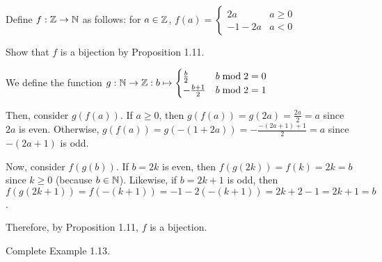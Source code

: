 \documentclass[class=math239,notes,tikz]{agony}
\begin{document}
\begin{xca}
  Define $f : \mathbb{Z} \to \mathbb{N}$ as follows: for $a \in \mathbb{Z}$,
  $f(a) = \begin{cases}
      2a    & a \geq 0 \\
      -1-2a & a < 0
    \end{cases}$

  Show that $f$ is a bijection by Proposition 1.11.
\end{xca}
\begin{prf}
  We define the function $g : \mathbb{N} \to \mathbb{Z} : b \mapsto \begin{cases}
      \frac{b}{2}    & b \bmod 2 = 0 \\
      -\frac{b+1}{2} & b \bmod 2 = 1
    \end{cases}$

  Then, consider $g(f(a))$.
  If $a \geq 0$, then $g(f(a)) = g(2a) = \frac{2a}{2} = a$ since $2a$ is even.
  Otherwise, $g(f(a)) = g(-(1+2a)) = -\frac{-(2a+1)+1}{2} = a$ since $-(2a+1)$ is odd.

  Now, consider $f(g(b))$.
  If $b = 2k$ is even, then $f(g(2k)) = f(k) = 2k = b$ since $k \geq 0$ (because $b \in \mathbb{N}$).
  Likewise, if $b = 2k+1$ is odd, then $f(g(2k+1)) = f(-(k+1)) = -1-2(-(k+1)) = 2k+2-1 = 2k+1 = b$.

  Therefore, by Proposition 1.11, $f$ is a bijection.
\end{prf}

\begin{xca}
  Complete Example 1.13.
\end{xca}
\end{document}
